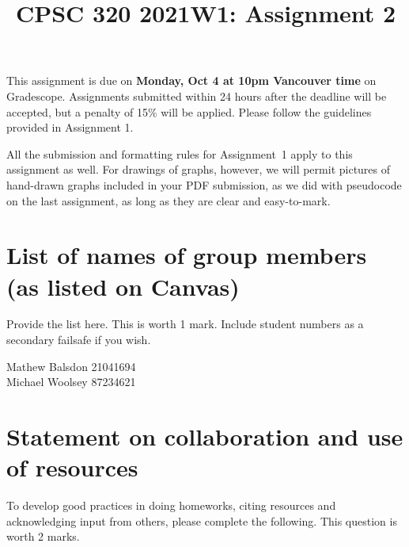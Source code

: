 \documentclass[11pt]{article}
\author{}
\date{}
\begin{document}
\title{CPSC 320 2021W1: Assignment 2}

\maketitle
\vspace{-0.5in}

This assignment is due on \textbf{Monday, Oct 4 at 10pm Vancouver time} on Gradescope. Assignments submitted within 24 hours after the deadline will be accepted, but a penalty of 15\% will be applied. Please follow the guidelines provided in Assignment 1.

All the submission and formatting rules for Assignment~1 apply to
this assignment as well.  For drawings of graphs, however, we will permit
pictures of hand-drawn graphs included in your PDF submission, as we did
with pseudocode on the last assignment, as long as they are clear and
easy-to-mark.

\section{List of names of group members (as listed on Canvas)}

Provide the list here. This is worth 1 mark. Include student numbers
as a secondary failsafe if you wish.

\begin{soln}
Mathew Balsdon 21041694 \\
Michael Woolsey 87234621
\end{soln}

\section{Statement on collaboration and use of resources}
To develop good practices in doing homeworks,
citing resources and acknowledging input from others, please complete the following.
This question is worth 2 marks.
\end{document}
